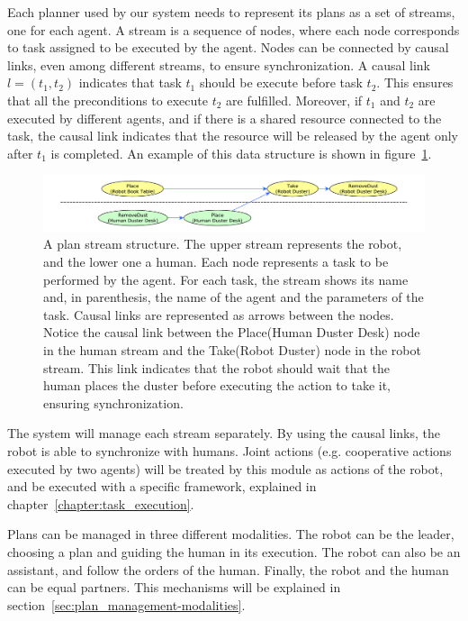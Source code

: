 Each planner used by our system needs to represent its plans as a set of streams, one for each agent. A stream is a sequence of nodes, where each node corresponds to task assigned to be executed by the agent. Nodes can be connected by causal links, even among different streams, to ensure synchronization. A causal link $l=(t_1,t_2)$ indicates that  task $t_1$ should be execute before task $t_2$. This ensures that all the preconditions to execute $t_2$ are fulfilled. Moreover, if $t_1$ and $t_2$ are executed by different agents, and if there is a shared resource connected to the task, the causal link indicates that the resource will be released by the agent only after $t_1$ is completed. An example of this data structure is shown in figure~\ref{fig:plan_management-streams}.

\begin{figure}[ht!]
 \centering
  \includegraphics[scale=0.45]{img/coworker/plan_management/streams.pdf}
 \caption[Plan data structures]{
 A plan stream structure. The upper stream represents the robot, and the lower one a human. Each node represents a task to be performed by the agent. For each task, the stream shows its name and, in parenthesis, the name of the agent and the parameters of the task. Causal links are represented as arrows between the nodes. Notice the causal link between the Place(Human Duster Desk) node in the human stream and the Take(Robot Duster) node in the robot stream. This link indicates that the robot should wait that the human places the duster before executing the action to take it, ensuring synchronization.}
 \label{fig:plan_management-streams}
 \end{figure}

The system will manage each stream separately. By using the causal links, the robot is able to synchronize with humans. Joint actions (e.g. cooperative actions executed by two agents) will be treated by this module as actions of the robot, and be executed with a specific framework,  explained in chapter~\ref{chapter:task_execution}.

Plans can be managed in three different modalities. The robot can be the leader, choosing a plan and guiding the human in its execution. The robot can also be an assistant, and follow the orders of the human. Finally, the robot and the human can be equal partners. This mechanisms will be explained in section~\ref{sec:plan_management-modalities}.


